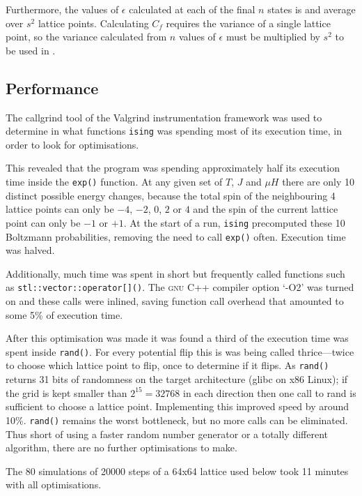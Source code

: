 \documentclass[12pt,a4paper,english]{article}
\begin{document}
Furthermore, the values of $\epsilon$ calculated at each of the final $n$ states is and average over $s^2$ lattice points.  Calculating $C_f$ requires the variance of a single lattice point, so the variance calculated from $n$ values of $\epsilon$ must be multiplied by $s^2$ to be used in .

\subsection{Performance}
The callgrind tool of the Valgrind instrumentation framework \cite{valgrind} was used to determine in what functions \texttt{ising} was spending most of its execution time, in order to look for optimisations.

This revealed that the program was spending approximately half its execution time inside the \texttt{exp()} function. At any given set of $T$, $J$ and $\mu H$ there are only 10 distinct possible energy changes, because the total spin of the neighbouring 4 lattice points can only be $-4$, $-2$, $0$, $2$ or $4$ and the spin of the current lattice point can only be $-1$ or $+1$.  At the start of a run, \texttt{ising} precomputed these 10 Boltzmann probabilities, removing the need to call \texttt{exp()} often.  Execution time was halved.

Additionally, much time was spent in short but frequently called functions such as \texttt{stl::vector::operator[]()}.  The \textsc{gnu} C++ compiler option `-O2' was turned on and these calls were inlined, saving function call overhead that amounted to some 5\% of execution time.

After this optimisation was made it was found a third of the execution time was spent inside \texttt{rand()}. For every potential flip this is was being called thrice---twice to choose which lattice point to flip, once to determine if it flips.  As \texttt{rand()} returns 31 bits of randomness on the target architecture (glibc on x86 Linux); if the grid is kept smaller than $2^{15}=32768$ in each direction then one call to rand is sufficient to choose a lattice point.  Implementing this improved speed by around 10\%. \texttt{rand()} remains the worst bottleneck, but no more calls can be eliminated.  Thus short of using a faster random number generator or a totally different algorithm, there are no further optimisations to make.

The 80 simulations of 20000 steps of a 64x64 lattice used below took 11 minutes with all optimisations.
\end{document}
